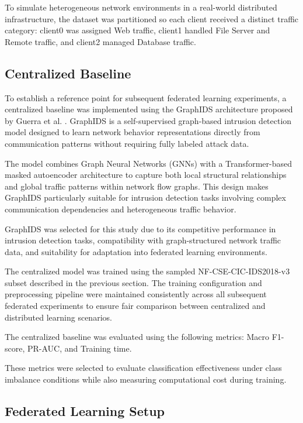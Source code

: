 \documentclass[conference]{IEEEtran}
\begin{document}
To simulate heterogeneous network environments in a real-world distributed infrastructure, the dataset was partitioned so each client received a distinct traffic category: client0 was assigned Web traffic, client1 handled File Server and Remote traffic, and client2 managed Database traffic.

\subsection{Centralized Baseline}

To establish a reference point for subsequent federated learning experiments, a centralized baseline was implemented using the GraphIDS architecture proposed by Guerra et al. \cite{guerra2025}. GraphIDS is a self-supervised graph-based intrusion detection model designed to learn network behavior representations directly from communication patterns without requiring fully labeled attack data.

The model combines Graph Neural Networks (GNNs) with a Transformer-based masked autoencoder architecture to capture both local structural relationships and global traffic patterns within network flow graphs. This design makes GraphIDS particularly suitable for intrusion detection tasks involving complex communication dependencies and heterogeneous traffic behavior.

GraphIDS was selected for this study due to its competitive performance in intrusion detection tasks, compatibility with graph-structured network traffic data, and suitability for adaptation into federated learning environments.

The centralized model was trained using the sampled NF-CSE-CIC-IDS2018-v3 subset described in the previous section. The training configuration and preprocessing pipeline were maintained consistently across all subsequent federated experiments to ensure fair comparison between centralized and distributed learning scenarios.

The centralized baseline was evaluated using the following metrics: Macro F1-score, PR-AUC, and Training time.

These metrics were selected to evaluate classification effectiveness under class imbalance conditions while also measuring computational cost during training.

\subsection{Federated Learning Setup}
\label{subsec:federated_learning_setup}
\end{document}
